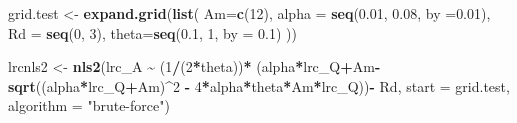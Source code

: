 \documentclass[
]{krantz}
\makeatletter
\newenvironment{Shaded}{\begin{snugshade}}{\end{snugshade}}
\newcommand{\DataTypeTok}[1]{\textcolor[rgb]{0.13,0.29,0.53}{#1}}
\newcommand{\DecValTok}[1]{\textcolor[rgb]{0.00,0.00,0.81}{#1}}
\newcommand{\FloatTok}[1]{\textcolor[rgb]{0.00,0.00,0.81}{#1}}
\newcommand{\KeywordTok}[1]{\textcolor[rgb]{0.13,0.29,0.53}{\textbf{#1}}}
\newcommand{\NormalTok}[1]{#1}
\newcommand{\OperatorTok}[1]{\textcolor[rgb]{0.81,0.36,0.00}{\textbf{#1}}}
\newcommand{\StringTok}[1]{\textcolor[rgb]{0.31,0.60,0.02}{#1}}
\newenvironment{kframe}{%
\medskip{}
\setlength{\fboxsep}{.8em}
 \def\at@end@of@kframe{}%
 \ifinner\ifhmode%
  \def\at@end@of@kframe{\end{minipage}}%
  \begin{minipage}{\columnwidth}%
 \fi\fi%
 \def\FrameCommand##1{\hskip\@totalleftmargin \hskip-\fboxsep
 \colorbox{shadecolor}{##1}\hskip-\fboxsep
     \hskip-\linewidth \hskip-\@totalleftmargin \hskip\columnwidth}%
 \MakeFramed {\advance\hsize-\width
   \@totalleftmargin\z@ \linewidth\hsize
   \@setminipage}}%
 {\par\unskip\endMakeFramed%
 \at@end@of@kframe}
\renewenvironment{Shaded}{\begin{kframe}}{\end{kframe}}
\makeatother
\begin{document}
\begin{Shaded}
\begin{Highlighting}[]
\NormalTok{grid.test \textless{}{-}}\StringTok{ }\KeywordTok{expand.grid}\NormalTok{(}\KeywordTok{list}\NormalTok{(}
  \DataTypeTok{Am=}\KeywordTok{c}\NormalTok{(}\DecValTok{12}\NormalTok{),}
  \DataTypeTok{alpha =} \KeywordTok{seq}\NormalTok{(}\FloatTok{0.01}\NormalTok{, }\FloatTok{0.08}\NormalTok{, }\DataTypeTok{by =}\FloatTok{0.01}\NormalTok{),}
  \DataTypeTok{Rd =} \KeywordTok{seq}\NormalTok{(}\DecValTok{0}\NormalTok{, }\DecValTok{3}\NormalTok{),}
  \DataTypeTok{theta=}\KeywordTok{seq}\NormalTok{(}\FloatTok{0.1}\NormalTok{, }\DecValTok{1}\NormalTok{, }\DataTypeTok{by =} \FloatTok{0.1}\NormalTok{)}
\NormalTok{  ))}

\NormalTok{lrcnls2 \textless{}{-}}\StringTok{ }\KeywordTok{nls2}\NormalTok{(lrc\_A }\OperatorTok{\textasciitilde{}}\StringTok{ }
\StringTok{        }\NormalTok{(}\DecValTok{1}\OperatorTok{/}\NormalTok{(}\DecValTok{2}\OperatorTok{*}\NormalTok{theta))}\OperatorTok{*}
\StringTok{        }\NormalTok{(alpha}\OperatorTok{*}\NormalTok{lrc\_Q}\OperatorTok{+}\NormalTok{Am}\OperatorTok{{-}}\KeywordTok{sqrt}\NormalTok{((alpha}\OperatorTok{*}\NormalTok{lrc\_Q}\OperatorTok{+}\NormalTok{Am)}\OperatorTok{\^{}}\DecValTok{2} \OperatorTok{{-}}\StringTok{ }
\StringTok{                               }\DecValTok{4}\OperatorTok{*}\NormalTok{alpha}\OperatorTok{*}\NormalTok{theta}\OperatorTok{*}\NormalTok{Am}\OperatorTok{*}\NormalTok{lrc\_Q))}\OperatorTok{{-}}\StringTok{ }
\StringTok{        }\NormalTok{Rd, }\DataTypeTok{start =}\NormalTok{ grid.test, }\DataTypeTok{algorithm =} \StringTok{"brute{-}force"}\NormalTok{)}
\end{Highlighting}
\end{Shaded}
\end{document}
